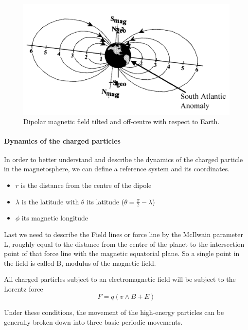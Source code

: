 \documentclass[./dissertation.tex]{subfiles}
\begin{document}
\begin{figure}[h!]
\centering
  \includegraphics[scale = 0.50]{imgs/radbelt1.png}
  \caption{Dipolar magnetic field tilted and off-centre with respect to Earth. \cite{bib2}}
  \label{fig:radbel1}
\end{figure}

\paragraph{Dynamics of the charged particles}

In order to better understand and describe the dynamics of the charged particle in the magnetosphere, we can define a reference system and its coordinates. 
\begin{itemize}
    \item $r$ is the distance from the centre of the dipole
    \item $\lambda$ is the latitude with $\theta$ its latitude ($\theta = \frac{\pi}{2} - \lambda$)
    \item $\phi$ its magnetic longitude
\end{itemize}

Last we need to describe the Field lines or force line by the McIlwain parameter L, roughly equal to the distance from the centre of the planet to the intersection point of that force line with the magnetic equatorial plane. So a single point in the field is called B, modulus of the magnetic field.

All charged particles subject to an electromagnetic field will be subject to the Lorentz force 
\begin{equation}
    F = q (v \wedge B + E )
\end{equation}

Under these conditions, the movement of the high-energy particles can be generally broken down into three basic periodic movements.
\end{document}
